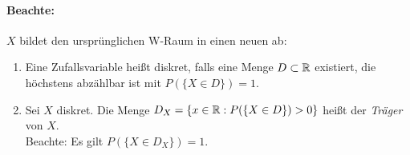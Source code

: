 
\paragraph{Beachte:}
$X$ bildet den ursprünglichen W-Raum in einen neuen ab:
\begin{center}
\end{center}

\begin{definition}
    \begin{enumerate}
        \item Eine Zufallsvariable heißt diskret, falls eine Menge $D \subset \mathbb{R}$
              existiert, die höchstens abzählbar ist mit $P(\{X \in D\})=1$.
        \item Sei $X$ diskret. Die Menge $D_X = \{ x \in \mathbb{R}: P(\{X \in D\})>0 \}$
              heißt der \emph{Träger} von $X$.\\
              Beachte: Es gilt $P(\{X \in D_X \}) = 1$.
    \end{enumerate}
\end{definition}
